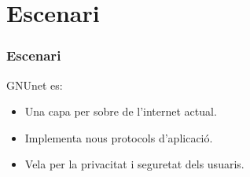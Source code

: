 \section{Escenari}

\begin{frame}
\frametitle{Escenari}
GNUnet es\cite{2002_2_GNet}:

\begin{itemize}
  \item<1-> Una capa per sobre de l'internet actual.
  \item<2-> Implementa nous protocols d'aplicació.
  \item<3-> Vela per la privacitat i seguretat dels usuaris.
\end{itemize}
\end{frame}
